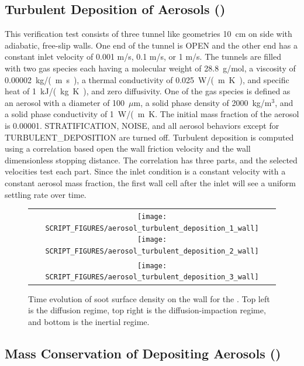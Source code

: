 \documentclass[11pt]{book}
\begin{document}
\subsection{Turbulent Deposition of Aerosols (\texorpdfstring{}{aerosol\_turbulent\_deposition})}
    \label{aerosol_turbulent_deposition}

This verification test consists of three tunnel like geometries 10~cm on side with adiabatic, free-slip walls. One end of the tunnel is {\ct OPEN} and the other end has a constant inlet velocity of 0.001 m/s, 0.1 m/s, or 1 m/s. The tunnels are filled with two gas species each having a molecular weight of 28.8~g/mol, a viscosity of 0.00002~\si{kg/(m.s)}, a thermal conductivity of 0.025~\si{W/(m.K)}, and specific heat of 1~\si{kJ/(kg.K)}, and zero diffusivity. One of the gas species is defined as an aerosol with a diameter of 100~$\mu$m, a solid phase density of 2000~kg/m$^3$, and a solid phase conductivity of 1~\si{W/(m.K}. The initial mass fraction of the aerosol is 0.00001. {\ct STRATIFICATION}, {\ct NOISE}, and all aerosol behaviors except for {\ct TURBULENT\_DEPOSITION} are turned off. Turbulent deposition is computed using a correlation based open the wall friction velocity and the wall dimensionless stopping distance. The correlation has three parts, and the selected velocities test each part. Since the inlet condition is a constant velocity with a constant aerosol mass fraction, the first wall cell after the inlet will see a uniform settling rate over time.

\begin{figure}[ht]
    \centering
    \begin{tabular}{c}
        \texttt{[image: SCRIPT\_FIGURES/aerosol\_turbulent\_deposition\_1\_wall]}
        \texttt{[image: SCRIPT\_FIGURES/aerosol\_turbulent\_deposition\_2\_wall]} \\
        \texttt{[image: SCRIPT\_FIGURES/aerosol\_turbulent\_deposition\_3\_wall]}
    \end{tabular}
    \caption[Wall surface densities for the  case]{Time evolution of soot surface density on the wall for the . Top left is the diffusion regime, top right is the diffusion-impaction regime, and bottom is the inertial regime.}
    \label{fig:turbulent_deposition}
\end{figure}

\subsection{Mass Conservation of Depositing Aerosols (\texorpdfstring{}{propane\_flame\_deposition})}
\label{propane_flame_deposition}
\end{document}
